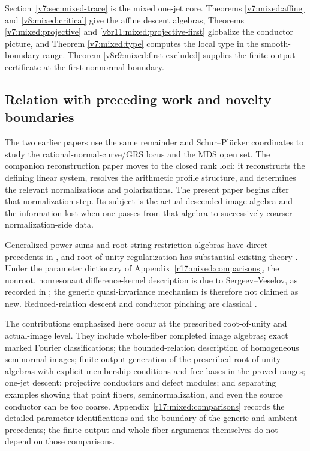\documentclass[10pt,fleqn]{article}
\numberwithin{equation}{section}
\begin{document}
Section~\ref{v7:sec:mixed-trace} is the mixed one-jet core.  Theorems
\ref{v7:mixed:affine} and \ref{v8:mixed:critical} give the affine descent
algebras, Theorems \ref{v7:mixed:projective} and
\ref{v8r11:mixed:projective-first} globalize the conductor picture, and
Theorem \ref{v7:mixed:type} computes the local type in the smooth-boundary
range.  Theorem \ref{v8r9:mixed:first-excluded} supplies the finite-output
certificate at the first nonnormal boundary.

\subsection{Relation with preceding work and novelty boundaries}

The two earlier papers \cite{LiYuanOrbits,LiYuanSchur} use the same
remainder and Schur--Pl\"ucker coordinates to study the
rational-normal-curve/GRS locus and the MDS open set.  The companion
reconstruction paper \cite{LiProfileGeometry} moves to the closed rank loci:
it reconstructs the defining linear system, resolves the arithmetic profile
structure, and determines the relevant normalizations and polarizations.
The present paper begins after that normalization step.  Its subject is the
actual descended image algebra and the information lost when one passes from
that algebra to successively coarser normalization-side data.

Generalized power sums and root-string restriction algebras have direct
precedents in
\cite{BrooknerCorwinEtingofSam,EtingofRains,SergeevVeselovMR,KasataniMultiwheel},
and root-of-unity regularization has substantial existing theory
\cite{FJMMTUnity,CherednikNonsemisimple}.  Under the parameter dictionary of
Appendix~\ref{r17:mixed:comparisons}, the nonroot, nonresonant
difference-kernel description is due to Sergeev--Veselov, as recorded in
\cite[Proposition~3.5(i)]{EtingofRains}; the generic quasi-invariance
mechanism is therefore not claimed as new.  Reduced-relation descent and
conductor pinching are classical \cite{Manaresi,Ferrand}.

The contributions emphasized here occur at the prescribed root-of-unity and
actual-image level.  They include whole-fiber completed image algebras;
exact marked Fourier classifications; the bounded-relation description of
homogeneous seminormal images; finite-output generation of the prescribed
root-of-unity algebras with explicit membership conditions and free bases in
the proved ranges; one-jet descent; projective conductors and defect modules;
and separating examples showing that point fibers, seminormalization, and
even the source conductor can be too coarse.  Appendix~\ref{r17:mixed:comparisons}
records the detailed parameter identifications and the boundary of the
generic and ambient precedents; the finite-output and whole-fiber arguments
themselves do not depend on those comparisons.
\end{document}
